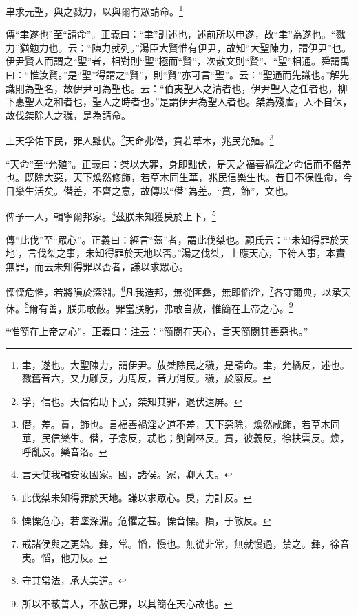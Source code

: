聿求元聖，與之戮力，以與爾有眾請命。\footnote{聿，遂也。大聖陳力，謂伊尹。放桀除民之穢，是請命。聿，允橘反，述也。戮舊音六，又力雕反，力周反，音力消反。穢，於廢反。}

{\noindent\shu{}\fzkt 傳“聿遂也”至“請命”。正義曰：“聿”訓述也，述前所以申遂，故“聿”為遂也。“戮力”猶勉力也。云：“陳力就列。”湯臣大賢惟有伊尹，故知“大聖陳力，謂伊尹”也。伊尹賢人而謂之“聖”者，相對則“聖”極而“賢”，次散文則“賢”、“聖”相通。舜謂禹曰：“惟汝賢。”是“聖”得謂之“賢”，則“賢”亦可言“聖”。云：“聖通而先識也。”解先識則為聖名，故伊尹可為聖也。云：“伯夷聖人之清者也，伊尹聖人之任者也，柳下惠聖人之和者也，聖人之時者也。”是謂伊尹為聖人者也。桀為殘虐，人不自保，故伐桀除人之穢，是為請命。 \par}

上天孚佑下民，罪人黜伏。\footnote{孚，信也。天信佑助下民，桀知其罪，退伏遠屏。}天命弗僣，賁若草木，兆民允殖。\footnote{僣，差。賁，飾也。言福善禍淫之道不差，天下惡除，煥然咸飾，若草木同華，民信樂生。僣，子念反，忒也；劉創林反。賁，彼義反，徐扶雲反。煥，呼亂反。樂音洛。}

{\noindent\shu{}\fzkt “天命”至“允殖”。正義曰：桀以大罪，身即黜伏，是天之福善禍淫之命信而不僣差也。既除大惡，天下煥然修飾，若草木同生華，兆民信樂生也。昔日不保性命，今日樂生活矣。僣差，不齊之意，故傳以“僣”為差。“賁，飾”，文也。 \par}

俾予一人，輯寧爾邦家。\footnote{言天使我輯安汝國家。國，諸侯。家，卿大夫。}茲朕未知獲戾於上下，\footnote{此伐桀未知得罪於天地。謙以求眾心。戾，力計反。}

{\noindent\shu{}\fzkt 傳“此伐”至“眾心”。正義曰：經言“茲”者，謂此伐桀也。顧氏云：“‘未知得罪於天地’，言伐桀之事，未知得罪於天地以否。”湯之伐桀，上應天心，下符人事，本實無罪，而云未知得罪以否者，謙以求眾心。 \par}

慄慄危懼，若將隕於深淵。\footnote{慄慄危心，若墜深淵。危懼之甚。慄音慄。隕，于敏反。}凡我造邦，無從匪彝，無即慆淫，\footnote{戒諸侯與之更始。彝，常。慆，慢也。無從非常，無就慢過，禁之。彝，徐音夷。慆，他刀反。}各守爾典，以承天休。\footnote{守其常法，承大美道。}爾有善，朕弗敢蔽。罪當朕躬，弗敢自赦，惟簡在上帝之心。\footnote{所以不蔽善人，不赦己罪，以其簡在天心故也。}

{\noindent\shu{}\fzkt “惟簡在上帝之心”。正義曰：注云：“簡閱在天心，言天簡閱其善惡也。” \par}

